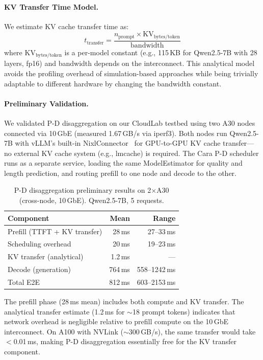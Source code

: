 \documentclass[letterpaper, anonymous, twocolumn, 10pt]{article}
\begin{document}
{\paragraph{KV Transfer Time Model.}
We estimate KV cache transfer time as:
\begin{equation}
t_{\text{transfer}} = \frac{n_{\text{prompt}} \times \text{KV}_{\text{bytes/token}}}{\text{bandwidth}}
\end{equation}
where $\text{KV}_{\text{bytes/token}}$ is a per-model constant (e.g., 115\,KB for Qwen2.5-7B with 28 layers, fp16) and bandwidth depends on the interconnect.
This analytical model avoids the profiling overhead of simulation-based approaches while being trivially adaptable to different hardware by changing the bandwidth constant.

\paragraph{Preliminary Validation.}
We validated P-D disaggregation on our CloudLab testbed using two A30 nodes connected via 10\,GbE (measured 1.67\,GB/s via iperf3).
Both nodes run Qwen2.5-7B with vLLM's built-in NixlConnector~\cite{nixl} for GPU-to-GPU KV cache transfer---no external KV cache system (e.g., lmcache) is required.
The Cara P-D scheduler runs as a separate service, loading the same ModelEstimator for quality and length prediction, and routing prefill to one node and decode to the other.

\begin{table}[H]
\centering
\small
\caption{P-D disaggregation preliminary results on 2$\times$A30 (cross-node, 10\,GbE). Qwen2.5-7B, 5 requests.}
\label{tab:pd_results}
\begin{tabular}{lrr}
\hline
Component & Mean & Range \\
\hline
Prefill (TTFT + KV transfer) & 28\,ms & 27--33\,ms \\
Scheduling overhead & 20\,ms & 19--23\,ms \\
KV transfer (analytical) & 1.2\,ms & --- \\
Decode (generation) & 764\,ms & 558--1242\,ms \\
\hline
Total E2E & 812\,ms & 603--2153\,ms \\
\hline
\end{tabular}
\end{table}

The prefill phase (28\,ms mean) includes both compute and KV transfer.
The analytical transfer estimate (1.2\,ms for $\sim$18 prompt tokens) indicates that network overhead is negligible relative to prefill compute on the 10\,GbE interconnect.
On A100 with NVLink ($\sim$300\,GB/s), the same transfer would take $<$0.01\,ms, making P-D disaggregation essentially free for the KV transfer component.

}
\end{document}

